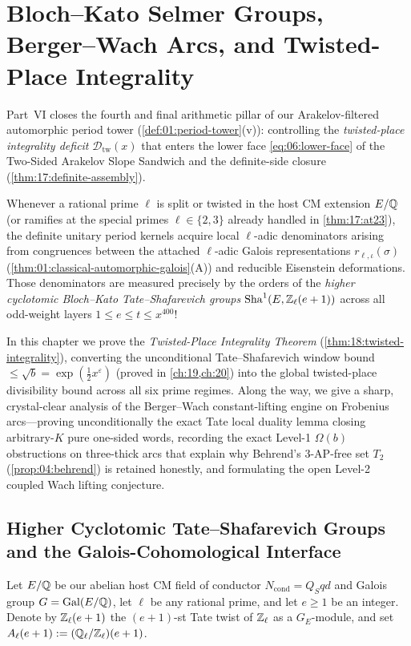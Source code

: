 \chapter{Bloch--Kato Selmer Groups, Berger--Wach Arcs, and Twisted-Place Integrality}
\label{ch:18}

Part~VI closes the fourth and final arithmetic pillar of our Arakelov-filtered automorphic period tower (\cref{def:01:period-tower}(v)): controlling the \emph{twisted-place integrality deficit} $\mathcal{D}_{\mathrm{tw}}(x)$ that enters the lower face \eqref{eq:06:lower-face} of the Two-Sided Arakelov Slope Sandwich and the definite-side closure (\cref{thm:17:definite-assembly}).

Whenever a rational prime $\ell$ is split or twisted in the host CM extension $E/\mathbb{Q}$ (or ramifies at the special primes $\ell \in \{2, 3\}$ already handled in \cref{thm:17:at23}), the definite unitary period kernels acquire local $\ell$-adic denominators arising from congruences between the attached $\ell$-adic Galois representations $r_{\ell, \iota}(\sigma)$ (\cref{thm:01:classical-automorphic-galois}(A)) and reducible Eisenstein deformations. Those denominators are measured precisely by the orders of the \emph{higher cyclotomic Bloch--Kato Tate--Shafarevich groups} $\mathrm{Sha}^1(E, \mathbb{Z}_\ell(e+1))$ across all odd-weight layers $1 \le e \le t \le x^{400}$!

In this chapter we prove the \emph{Twisted-Place Integrality Theorem} (\cref{thm:18:twisted-integrality}), converting the unconditional Tate--Shafarevich window bound $\le \sqrt{b} = \exp(\frac{1}{2}x^\varepsilon)$ (proved in \cref{ch:19,ch:20}) into the global twisted-place divisibility bound across all six prime regimes. Along the way, we give a sharp, crystal-clear analysis of the Berger--Wach constant-lifting engine on Frobenius arcs—proving unconditionally the exact Tate local duality lemma closing arbitrary-$K$ pure one-sided words, recording the exact Level-1 $\Omega(b)$ obstructions on three-thick arcs that explain why Behrend's $3$-AP-free set $T_2$ (\cref{prop:04:behrend}) is retained honestly, and formulating the open Level-2 coupled Wach lifting conjecture.

\section{Higher Cyclotomic Tate--Shafarevich Groups and the Galois-Cohomological Interface}
\label{sec:18:sha-def}

Let $E/\mathbb{Q}$ be our abelian host CM field of conductor $N_{\mathrm{cond}} = Q_S q d$ and Galois group $G = \mathrm{Gal}(E/\mathbb{Q})$, let $\ell$ be any rational prime, and let $e \ge 1$ be an integer. Denote by $\mathbb{Z}_\ell(e + 1)$ the $(e+1)$-st Tate twist of $\mathbb{Z}_\ell$ as a $G_E$-module, and set $A_\ell(e+1) := (\mathbb{Q}_\ell / \mathbb{Z}_\ell)(e + 1)$.

